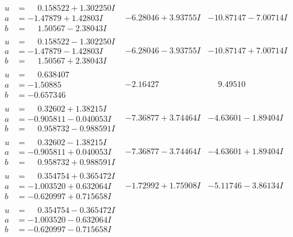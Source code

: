 \documentclass[1p]{elsarticle_modified}
\theoremstyle{definition}
\begin{document}
$$\begin{array}{c|c|c}
\begin{aligned}
u &= \phantom{-}0.158522 + 1.302250 I \\
a &= -1.47879 + 1.42803 I \\
b &= \phantom{-}1.50567 - 2.38043 I\end{aligned}
 & -6.28046 + 3.93755 I & -10.87147 - 7.00714 I \\ \hline\begin{aligned}
u &= \phantom{-}0.158522 - 1.302250 I \\
a &= -1.47879 - 1.42803 I \\
b &= \phantom{-}1.50567 + 2.38043 I\end{aligned}
 & -6.28046 - 3.93755 I & -10.87147 + 7.00714 I \\ \hline\begin{aligned}
u &= \phantom{-}0.638407\phantom{ +0.000000I} \\
a &= -1.50885\phantom{ +0.000000I} \\
b &= -0.657346\phantom{ +0.000000I}\end{aligned}
 & -2.16427\phantom{ +0.000000I} & \phantom{-}9.49510\phantom{ +0.000000I} \\ \hline\begin{aligned}
u &= \phantom{-}0.32602 + 1.38215 I \\
a &= -0.905811 - 0.040053 I \\
b &= \phantom{-}0.958732 - 0.988591 I\end{aligned}
 & -7.36877 + 3.74464 I & -4.63601 - 1.89404 I \\ \hline\begin{aligned}
u &= \phantom{-}0.32602 - 1.38215 I \\
a &= -0.905811 + 0.040053 I \\
b &= \phantom{-}0.958732 + 0.988591 I\end{aligned}
 & -7.36877 - 3.74464 I & -4.63601 + 1.89404 I \\ \hline\begin{aligned}
u &= \phantom{-}0.354754 + 0.365472 I \\
a &= -1.003520 + 0.632064 I \\
b &= -0.620997 + 0.715658 I\end{aligned}
 & -1.72992 + 1.75908 I & -5.11746 - 3.86134 I \\ \hline\begin{aligned}
u &= \phantom{-}0.354754 - 0.365472 I \\
a &= -1.003520 - 0.632064 I \\
b &= -0.620997 - 0.715658 I\end{aligned}

\end{array}$$
\end{document}
